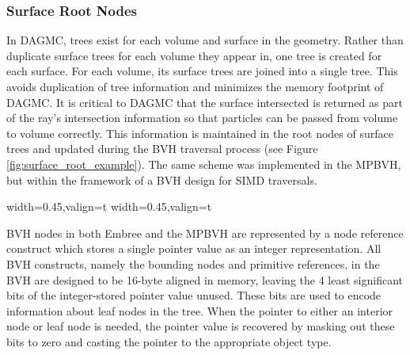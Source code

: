 \subsubsection{Surface Root Nodes}

In DAGMC, trees exist for each volume and surface in the geometry. Rather
than duplicate surface trees for each volume they appear in, one tree is created
for each surface. For each volume, its surface trees are joined
into a single tree. This avoids duplication of tree information and minimizes
the memory footprint of DAGMC. It is critical to DAGMC that the surface
intersected is returned as part of the ray's intersection information so that
particles can be passed from volume to volume correctly. This information is
maintained in the root nodes of surface trees and updated during the BVH
traversal process (see Figure \ref{fig:surface_root_example}). The same
scheme was implemented in the MPBVH, but within the framework of a BVH design
for SIMD traversals.

\begin{sidewaysfigure}
  \centering
  {width=0.45\textwidth,valign=t}
  {width=0.45\textwidth,valign=t}
  \caption[DAGMC BVH topology.]{Left: Representation of a faceted DAGMC
    geometry. Right: The corresponding BVH structure for that volume. Surface
    sub-trees are shared between volumes to avoid duplicate data.}
  \label{fig:surface_root_example}
\end{sidewaysfigure}

BVH nodes in both Embree and the MPBVH are represented by a node
reference construct which stores a single pointer value as an integer
representation. All BVH constructs, namely the bounding nodes and primitive
references, in the BVH are designed to be 16-byte aligned in memory, leaving the
4 least significant bits of the integer-stored pointer value unused. These bits
are used to encode information about leaf nodes in the tree. When the
pointer to either an interior node or leaf node is needed, the pointer value is
recovered by masking out these bits to zero and casting the pointer to the
appropriate object type.


